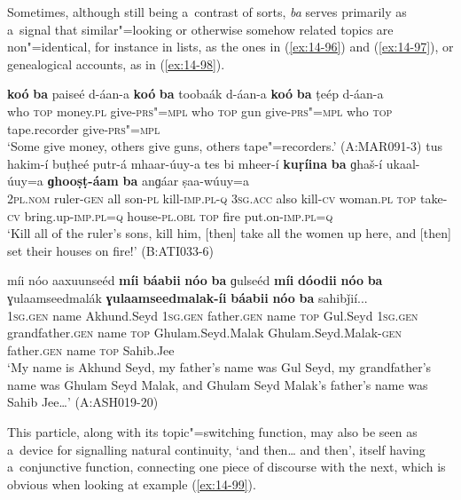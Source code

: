 Sometimes, although still being a~contrast of sorts, \textit{ba} serves primarily as a~signal that similar"=looking or otherwise somehow related topics are non"=identical, for instance in lists, as the ones in (\ref{ex:14-96}) and (\ref{ex:14-97}), or genealogical accounts, as in (\ref{ex:14-98}). 

\begin{exe}
\ex
\label{ex:14-96}
\gll \textbf{koó} \textbf{ba} paiseé d-áan-a \textbf{koó} \textbf{ba} toobaák d-áan-a \textbf{koó} \textbf{ba} ṭeép d-áan-a\\
who \textsc{top} money.\textsc{pl} give-\textsc{prs"=mpl} who \textsc{top} gun  give-\textsc{prs"=mpl} who \textsc{top} tape.recorder give-\textsc{prs"=mpl} \\
\glt `Some give money, others give guns, others tape"=recorders.' (A:MAR091-3)
\ex
\label{ex:14-97}
\gll tus hakim-í buṭheé putr-á mhaar-úuy-a tes bi mheer-í \textbf{kuṛíina} \textbf{ba} ɡhaš-í ukaal-úuy=a \textbf{ɡhooṣṭ-áam} \textbf{ba} anɡáar ṣaa-wúuy=a\\
\textsc{2pl.nom} ruler-\textsc{gen} all son-\textsc{pl} kill-\textsc{imp.pl-q} \textsc{3sg.acc} also kill-\textsc{cv} woman.\textsc{pl} \textsc{top} take-\textsc{cv} bring.up-\textsc{imp.pl=q}  house-\textsc{pl.obl} \textsc{top} fire put.on-\textsc{imp.pl=q}\\
\glt `Kill all of the ruler's sons, kill him, [then] take all the women up here, and [then] set their houses on fire!' (B:ATI033-6)

\ex
\label{ex:14-98}
\gll míi nóo aaxuunseéd \textbf{míi} \textbf{báabii} \textbf{nóo} \textbf{ba}  ɡulseéd \textbf{míi} \textbf{dóodii} \textbf{nóo} \textbf{ba} ɣulaamseedmalák \textbf{ɣulaamseedmalak-íi} \textbf{báabii} \textbf{nóo} \textbf{ba} sahibǰií... \\
\textsc{1sg.gen} name Akhund.Seyd \textsc{1sg.gen} father.\textsc{gen} name \textsc{top} Gul.Seyd \textsc{1sg.gen} grandfather.\textsc{gen} name \textsc{top} Ghulam.Seyd.Malak Ghulam.Seyd.Malak-\textsc{gen} father.\textsc{gen} name \textsc{top} Sahib.Jee  \\
\glt `My name is Akhund Seyd, my father's name was Gul Seyd, my grandfather's name was Ghulam Seyd Malak, and Ghulam Seyd Malak's father's name was Sahib Jee{\ldots}' (A:ASH019-20)
\end{exe}

This particle, along with its topic"=switching function, may also be seen as a~device for signalling natural continuity, `and then{\ldots} and then', itself having a~conjunctive function, connecting one piece of discourse with the next, which is obvious when looking at example (\ref{ex:14-99}).

